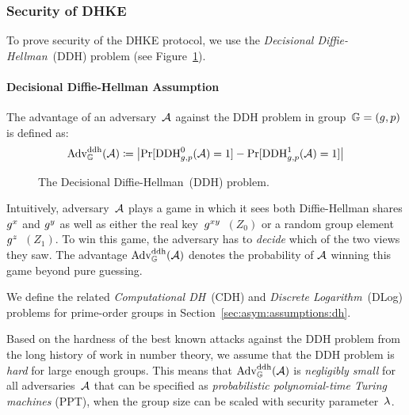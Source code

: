 \subsubsection{Security of DHKE}
To prove security of the DHKE protocol, we use the \emph{Decisional Diffie-Hellman}~(DDH) problem (see Figure~\ref{fig:ddh_assumption}).

\paragraph{Decisional Diffie-Hellman Assumption}
The advantage of an adversary~$\mathcal{A}$ against the DDH problem in group~$\mathbb{G}=(g, p)$ is defined as:
\[\mathrm{Adv}_{\mathbb{G}}^{\mathrm{ddh}}(\mathcal{A})\coloneqq\left|\Pr[{\mathrm{DDH}}^0_{g,p}(\mathcal{A})=1]-\Pr[{\mathrm{DDH}}^1_{g,p}(\mathcal{A})=1]\right|\]
\begin{figure}[t]
    \centering
    
    \caption{The Decisional Diffie-Hellman~(DDH) problem.}
    \label{fig:ddh_assumption}
\end{figure}

Intuitively, adversary~$\mathcal{A}$ plays a game in which it sees both Diffie-Hellman shares $g^x$ and $g^y$ as well as either the real key~$g^{xy}$~$(Z_0)$ or a random group element~$g^z$~$(Z_1)$.
To win this game, the adversary has to \emph{decide} which of the two views they saw.
The advantage $\mathrm{Adv}_{\mathbb{G}}^{\mathrm{ddh}}(\mathcal{A})$ denotes the probability of $\mathcal{A}$ winning this game beyond pure guessing.

We define the related \emph{Computational DH}~(CDH) and \emph{Discrete Logarithm}~(DLog) problems for prime-order groups in Section~\ref{sec:asym:assumptions:dh}.

Based on the hardness of the best known attacks against the DDH problem from the long history of work in number theory, we assume that the DDH problem is \emph{hard} for large enough groups.
This means that $\mathrm{Adv}_{\mathbb{G}}^{\mathrm{ddh}}(\mathcal{A})$ is \emph{negligibly small} for all adversaries~$\mathcal{A}$ that can be specified as \emph{probabilistic polynomial-time Turing machines} (PPT), when the group size can be scaled with security parameter~$\lambda$.

